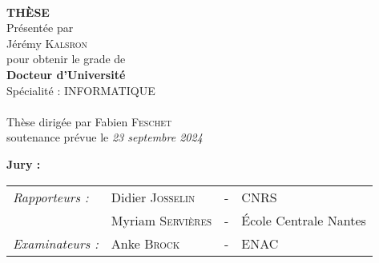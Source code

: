 

\begin{titlepage}
\begin{center}
 \\
\vspace*{0.1cm}
\vspace*{0.1cm}
\vspace*{0.1cm}

\vspace*{0.5cm}
\noindent \Huge \textbf{THÈSE} \\
\vspace*{0.3cm}
\noindent \large {Présentée par\\}
\noindent \LARGE Jérémy \textsc{Kalsron} \\
\vspace*{0.8cm}
\noindent \large {pour obtenir le grade de} \\
\noindent \LARGE \textbf{Docteur d'Université} \\
\vspace*{0.3cm}
\noindent \large {Spécialité : INFORMATIQUE} \\
\vspace*{0.8cm}
 \\
\vspace*{0.8cm}
\noindent \Large Thèse dirigée par Fabien \textsc{Feschet} \\
\vspace*{0.2cm}
\noindent \large soutenance prévue le \textit{23 septembre 2024} \\
\vspace*{0.2cm}
\end{center}
\noindent \large \textbf{Jury :} \\
\begin{center}
\noindent \large 
\begin{tabular}{llcl}
      \textit{Rapporteurs :}	& Didier \textsc{Josselin}		& - & CNRS \\
                              & Myriam \textsc{Servières}		& - & École Centrale Nantes \\
      \textit{Examinateurs :} & Anke \textsc{Brock}		      & - & ENAC  \\

\end{tabular}
\end{center}
\end{titlepage}
